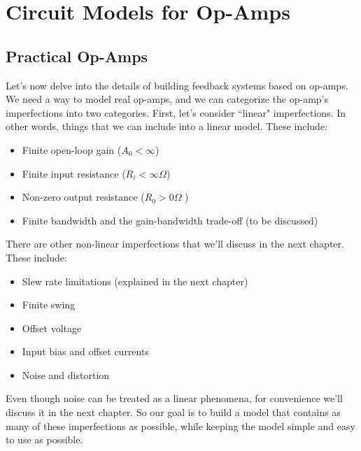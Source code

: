 \section{Circuit Models for Op-Amps}
\subsection{Practical Op-Amps}
Let's now delve into the details of building feedback systems based on op-amps.  We need a way to model real op-amps, and we can categorize the op-amp's imperfections into two categories.  First, let's consider ``linear" imperfections. In other words, things that we can include into a linear model.  These include:
    \begin{itemize}
        \item  Finite open-loop gain ($A_0 < \infty$)
        \item  Finite input resistance ($R_i < \infty\Omega$)
     	\item Non-zero output resistance ($R_0 > 0\Omega$ )
     	\item Finite bandwidth and the gain-bandwidth trade-off (to be discussed) 
    \end{itemize}
There are other non-linear imperfections that we'll discuss in the next chapter.  These include:
    \begin{itemize}
        \item Slew rate limitations (explained in the next chapter)
        \item Finite swing
        \item Offset voltage
        \item Input bias and offset currents
        \item Noise and distortion
    \end{itemize}
Even though noise can be treated as a linear phenomena, for convenience we'll discuss it in the next chapter.  So our goal is to build a model that contains as many of these imperfections as possible, while keeping the model simple and easy to use as possible.
